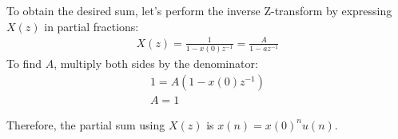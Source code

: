 \documentclass{article}
\begin{document}
To obtain the desired sum, let's perform the inverse Z-transform by expressing \( X(z) \) in partial fractions:
\begin{align}
X(z) = \frac{1}{1 - x(0)z^{-1}} = \frac{A}{1 - az^{-1}} 
\end{align}
To find \(A\), multiply both sides by the denominator:
\begin{align}
1 = A(1 - x(0)z^{-1}) \\
A=1
\end{align}

Therefore, the partial sum using \(X(z)\) is \(x(n) = x(0)^n u(n)\).
\end{document}
